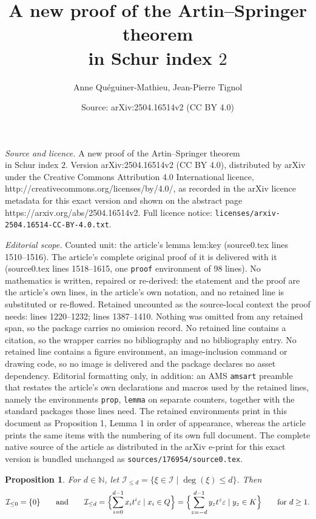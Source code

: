 \documentclass[10pt,a4paper]{amsart}
\title{A new proof of the Artin--Springer theorem\\ in Schur index $2$}
\author{Anne Qu\'eguiner-Mathieu, Jean-Pierre Tignol}
\date{Source: arXiv:2504.16514v2 (CC BY 4.0)}
\newtheorem{prop}{Proposition}
\newcommand{\calI}{\mathcal{I}}
\begin{document}
\maketitle

\noindent\emph{Source and licence.} A new proof of the Artin--Springer theorem\\ in Schur index $2$. Version arXiv:2504.16514v2 (CC BY 4.0), distributed by arXiv under the Creative Commons Attribution 4.0 International licence, http://creativecommons.org/licenses/by/4.0/, as recorded in the arXiv licence metadata for this exact version and shown on the abstract page https://arxiv.org/abs/2504.16514v2. Full licence notice: \texttt{licenses/arxiv-2504.16514-CC-BY-4.0.txt}.\par\smallskip

\noindent\textit{Editorial scope.} Counted unit: the article's lemma lem:key (source0.tex lines 1510--1516). The article's complete original proof of it is delivered with it (source0.tex lines 1518--1615, one \texttt{proof} environment of 98 lines). No mathematics is written, repaired or re-derived: the statement and the proof are the article's own lines, in the article's own notation, and no retained line is substituted or re-flowed.  Retained uncounted as the source-local context the proof needs: lines 1220--1232; lines 1387--1410.  Nothing was omitted from any retained span, so the package carries no omission record.  No retained line contains a citation, so the wrapper carries no bibliography and no bibliography entry.  No retained line contains a figure environment, an image-inclusion command or drawing code, so no image is delivered and the package declares no asset dependency.  Editorial formatting only, in addition: an AMS \texttt{amsart} preamble that restates the article's own declarations and macros used by the retained lines, namely the environments \texttt{prop}, \texttt{lemma} on separate counters, together with the standard packages those lines need.  The retained environments print in this document as Proposition 1, Lemma 1 in order of appearance, whereas the article prints the same items with the numbering of its own full document.  The complete native source of the article as distributed in the arXiv e-print for this exact version is bundled unchanged as \texttt{sources/176954/source0.tex}.
\begin{prop}
  \label{prop:degI}
  For $d\in\mathbb{N}$, let $\calI_{\leq d} =
  \{\xi\in\calI\mid 
  \deg(\xi)\leq d\}$. Then
  \[
    \calI_{\leq0}=\{0\} \qquad\text{and}\qquad
    \calI_{\leq d} = \Bigl\{\sum_{i=0}^{d-1}x_it^i\varepsilon \mid
    x_i\in Q\Bigr\}
    =\Bigl\{\sum_{z=-d}^{d-1} y_zt^z\varepsilon \mid
    y_z\in K\Bigr\}\qquad\text{for $d\geq1$.}
  \]
\end{prop}
\end{document}
